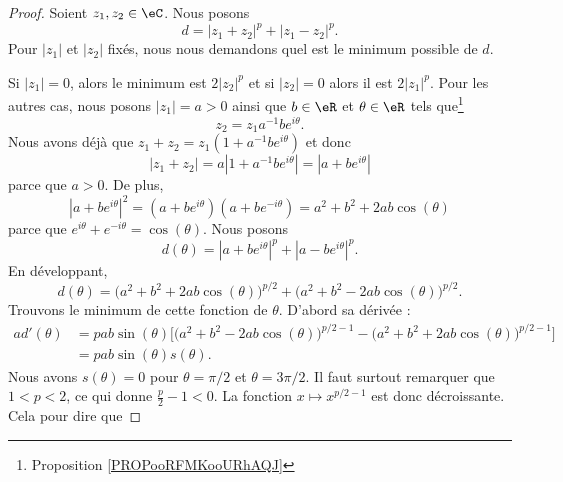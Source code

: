\begin{proof}
    Soient \( z_1,z_2\in \eC\). Nous posons
    \begin{equation}        \label{EQooJKYZooFzbETG}
        d=| z_1+z_2 |^p+| z_1-z_2 |^p.
    \end{equation}
    Pour \( | z_1 |\) et \( | z_2 |\) fixés, nous nous demandons quel est le minimum possible de \( d\).

    Si \( | z_1 |=0\), alors le minimum est \( 2| z_2 |^p\) et si \( | z_2 |=0\) alors il est \( 2| z_1 |^p\). Pour les autres cas, nous posons $| z_1 |=a>0$ ainsi que \( b\in \eR\) et \( \theta\in \eR\) tels que\footnote{Proposition \ref{PROPooRFMKooURhAQJ}}
    \begin{equation}
        z_2=z_1a^{-1}b e^{i\theta}.
    \end{equation}
    Nous avons déjà que \( z_1+z_2=z_1(1+a^{-1}b e^{i\theta})\) et donc
    \begin{equation}
        | z_1+z_2 |=a| 1+a^{-1}b e^{i\theta} |=| a+b e^{i\theta} |
    \end{equation}
    parce que \( a>0\). De plus,
    \begin{equation}
        | a+b e^{i\theta} |^2= (a+b e^{i\theta})(a+b e^{-i\theta})=a^2+b^2+2ab\cos(\theta)
    \end{equation}
    parce que \(  e^{i\theta}+ e^{-i\theta}=\cos(\theta)\). Nous posons
    \begin{equation}
        d(\theta)=| a+b e^{i\theta} |^p+| a-b e^{i\theta} |^p.
    \end{equation}
    En développant,
    \begin{equation}
        d(\theta)=\big(a^2+b^2+2ab\cos(\theta)\big)^{p/2}+\big(a^2+b^2-2ab\cos(\theta)\big)^{p/2}.
    \end{equation}
    Trouvons le minimum de cette fonction de \( \theta\). D'abord sa dérivée :
    \begin{subequations}
        \begin{align}
            ad'(\theta)&=pab\sin(\theta)\big[ \big( a^2+b^2-2ab\cos(\theta) \big)^{p/2-1}-\big( a^2+b^2+2ab\cos(\theta) \big)^{p/2-1}  \big]\\
            &=pab\sin(\theta)s(\theta).
        \end{align}
    \end{subequations}
    Nous avons \( s(\theta)=0\) pour \( \theta=\pi/2\) et \( \theta=3\pi/2\). Il faut surtout remarquer que \( 1<p<2\), ce qui donne \( \frac{ p }{2}-1<0\). La fonction \( x\mapsto x^{p/2-1}\) est donc décroissante. Cela pour dire que

\end{proof}
